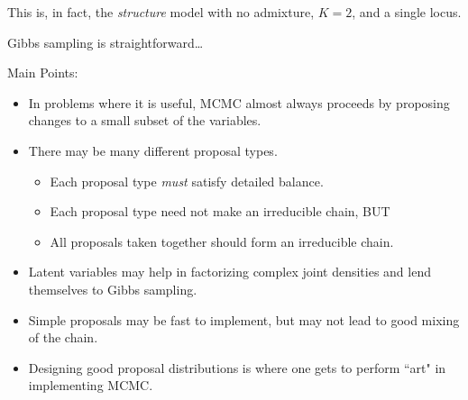This is, in fact, the {\em structure} model with no admixture, $K=2$, and a single locus.

Gibbs sampling is straightforward\ldots\hfill{}

Main Points:
\begin{itemize}
\item In problems where it is useful, MCMC almost always proceeds by proposing changes to a small subset of the variables.
\item There may be many different proposal types.
\begin{itemize}
\item Each proposal type {\em must} satisfy detailed balance.
\item Each proposal type need not make an irreducible chain, BUT
\item All proposals taken together should form an irreducible chain.
\end{itemize}
\item Latent variables may help in factorizing complex joint densities and lend themselves to Gibbs sampling.
\item Simple proposals may be fast to implement, but may not lead to good mixing of the chain.
\item Designing good proposal distributions is where one gets to perform ``art" in implementing MCMC.
\end{itemize}



